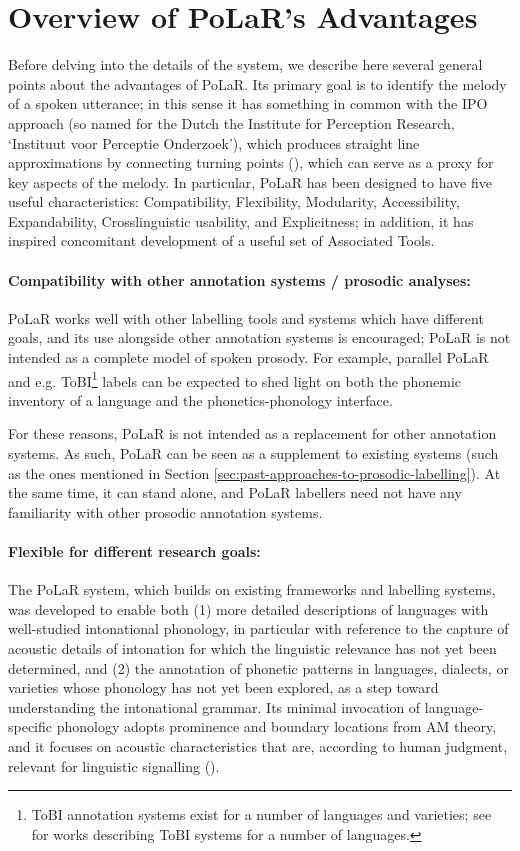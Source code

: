 \documentclass[11pt, twoside]{memoir}
\begin{document}
\section{Overview of PoLaR’s Advantages}\label{sec:overview-of-PoLaRs-advantages}
Before delving into the details of the system, we describe here several general points about the advantages of PoLaR. Its primary goal is to identify the melody of a spoken utterance; in this sense it has something in common with the IPO approach (so named for the Dutch the Institute for Perception Research, ‘Instituut voor Perceptie Onderzoek’), which produces straight line approximations by connecting turning points (\citealt{t-hart-90}), which can serve as a proxy for key aspects of the melody.  In particular, PoLaR has been designed to have five useful characteristics: Compatibility, Flexibility, Modularity, Accessibility, Expandability, Crosslinguistic usability, and Explicitness; in addition, it has inspired concomitant development of a useful set of Associated Tools. 

\paragraph{Compatibility with other annotation systems / prosodic analyses:}
PoLaR works well with other labelling tools and systems which have different goals, and its use alongside other annotation systems is encouraged; PoLaR is not intended as a complete model of spoken prosody.  For example, parallel PoLaR and e.g. ToBI\footnote{ToBI annotation systems exist for a number of languages and varieties; see \citealt{jun05, jun14} for works describing ToBI systems for a number of languages.} labels can be expected to shed light on both the phonemic inventory of a language and the phonetics-phonology interface. 

For these reasons, PoLaR is not intended as a replacement for other annotation systems. As such, PoLaR can be seen as a supplement to existing systems (such as the ones mentioned in Section \ref{sec:past-approaches-to-prosodic-labelling}). At the same time, it can stand alone, and PoLaR labellers need not have any familiarity with other prosodic annotation systems.

\paragraph{Flexible for different research goals:}
The PoLaR system, which builds on existing frameworks and labelling systems, was developed to enable both (1) more detailed descriptions of languages with well-studied intonational phonology, in particular with reference to the capture of acoustic details of intonation for which the linguistic relevance has not yet been determined, and (2) the annotation of phonetic patterns in languages, dialects, or varieties whose phonology has not yet been explored, as a step toward understanding the intonational grammar. Its minimal invocation of language-specific phonology adopts prominence and boundary locations from AM theory, and it focuses on acoustic characteristics that are, according to human judgment, relevant for linguistic signalling (\citealt{barnesshattuckhufnagel20}).   
\end{document}
